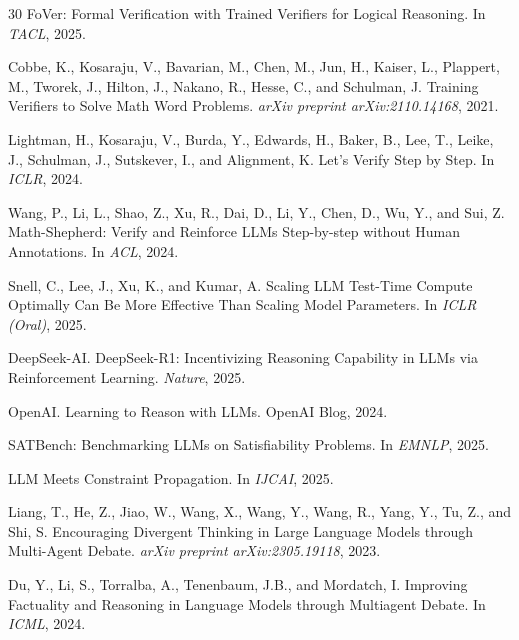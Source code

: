 \documentclass[11pt,a4paper]{article}
\begin{document}
\begin{thebibliography}{30}
FoVer: Formal Verification with Trained Verifiers for Logical Reasoning.
\newblock In \emph{TACL}, 2025.

Cobbe, K., Kosaraju, V., Bavarian, M., Chen, M., Jun, H., Kaiser, L., Plappert, M., Tworek, J., Hilton, J., Nakano, R., Hesse, C., and Schulman, J.
\newblock Training Verifiers to Solve Math Word Problems.
\newblock \emph{arXiv preprint arXiv:2110.14168}, 2021.

Lightman, H., Kosaraju, V., Burda, Y., Edwards, H., Baker, B., Lee, T., Leike, J., Schulman, J., Sutskever, I., and Alignment, K.
\newblock Let's Verify Step by Step.
\newblock In \emph{ICLR}, 2024.

Wang, P., Li, L., Shao, Z., Xu, R., Dai, D., Li, Y., Chen, D., Wu, Y., and Sui, Z.
\newblock Math-Shepherd: Verify and Reinforce LLMs Step-by-step without Human Annotations.
\newblock In \emph{ACL}, 2024.

Snell, C., Lee, J., Xu, K., and Kumar, A.
\newblock Scaling LLM Test-Time Compute Optimally Can Be More Effective Than Scaling Model Parameters.
\newblock In \emph{ICLR (Oral)}, 2025.

DeepSeek-AI.
\newblock DeepSeek-R1: Incentivizing Reasoning Capability in LLMs via Reinforcement Learning.
\newblock \emph{Nature}, 2025.

OpenAI.
\newblock Learning to Reason with LLMs.
\newblock OpenAI Blog, 2024.

SATBench: Benchmarking LLMs on Satisfiability Problems.
\newblock In \emph{EMNLP}, 2025.

LLM Meets Constraint Propagation.
\newblock In \emph{IJCAI}, 2025.

Liang, T., He, Z., Jiao, W., Wang, X., Wang, Y., Wang, R., Yang, Y., Tu, Z., and Shi, S.
\newblock Encouraging Divergent Thinking in Large Language Models through Multi-Agent Debate.
\newblock \emph{arXiv preprint arXiv:2305.19118}, 2023.

Du, Y., Li, S., Torralba, A., Tenenbaum, J.B., and Mordatch, I.
\newblock Improving Factuality and Reasoning in Language Models through Multiagent Debate.
\newblock In \emph{ICML}, 2024.


\end{thebibliography}
\end{document}
